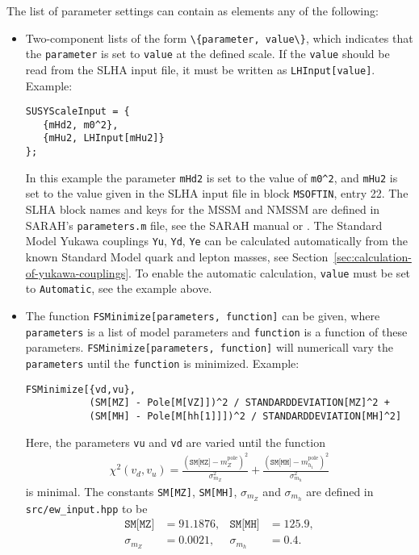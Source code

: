 \documentclass[final,3p,times,pdflatex]{elsarticle}
\newcommand{\code}[1]{\lstinline|#1|}  %
\newcommand{\pole}{\text{pole}}
\begin{document}
The list of parameter settings can contain as elements any of the
following:
%
\begin{itemize}
\item Two-component lists of the form \code{\{parameter, value\}},
  which indicates that the \code{parameter} is set to \code{value} at
  the defined scale.  If the \code{value} should be read from the SLHA
  input file, it must be written as \code{LHInput[value]}.  Example:
  \begin{lstlisting}
SUSYScaleInput = {
   {mHd2, m0^2},
   {mHu2, LHInput[mHu2]}
};
  \end{lstlisting}
  In this example the parameter \code{mHd2} is set to the value of
  \code{m0^2}, and \code{mHu2} is set to the value given in the SLHA
  input file in block \code{MSOFTIN}, entry 22.  The SLHA block names
  and keys for the MSSM and NMSSM are defined in SARAH's
  \code{parameters.m} file, see the SARAH manual or
  \cite{Staub:2010jh}.  The Standard Model Yukawa couplings \code{Yu},
  \code{Yd}, \code{Ye} can be calculated automatically from the known
  Standard Model quark and lepton masses, see
  Section~\ref{sec:calculation-of-yukawa-couplings}.  To enable the
  automatic calculation, \code{value} must be set to \code{Automatic},
  see the example above.

\item The function \code{FSMinimize[parameters, function]} can be
  given, where \code{parameters} is a list of model parameters and
  \code{function} is a function of these parameters.
  \code{FSMinimize[parameters, function]} will numericall vary the
  \code{parameters} until the \code{function} is minimized.  Example:
  \begin{lstlisting}
FSMinimize[{vd,vu},
           (SM[MZ] - Pole[M[VZ]])^2 / STANDARDDEVIATION[MZ]^2 +
           (SM[MH] - Pole[M[hh[1]]])^2 / STANDARDDEVIATION[MH]^2]
  \end{lstlisting}
  Here, the parameters \code{vu} and \code{vd} are varied until the
  function
  \begin{align}
    \chi^2(v_d,v_u) =
    \frac{(\texttt{SM[MZ]}-m_Z^\pole)^2}{\sigma_{m_Z}^2} +
    \frac{(\texttt{SM[MH]}-m_{h_1}^\pole)^2}{\sigma_{m_h}^2}
  \end{align}
  is minimal.  The constants \code{SM[MZ]}, \code{SM[MH]},
  $\sigma_{m_Z}$ and $\sigma_{m_h}$ are defined in
  \code{src/ew_input.hpp} to be
  \begin{align}
    \texttt{SM[MZ]} &= 91.1876, &
    \texttt{SM[MH]} &= 125.9, \\
    \sigma_{m_Z} &= 0.0021, &
    \sigma_{m_h} &= 0.4 .
  \end{align}


\end{itemize}
\end{document}
